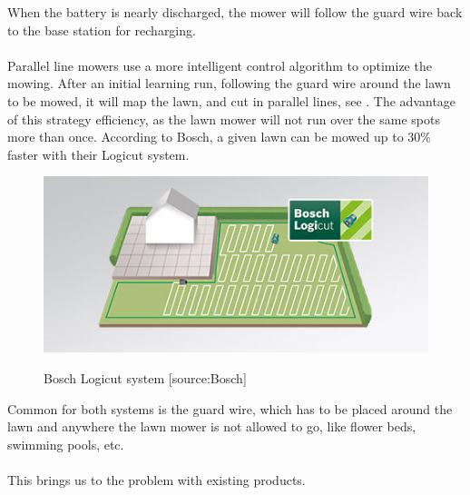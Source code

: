 \noindent
When the battery is nearly discharged, the mower will follow the guard wire back to the base station for recharging.\\\\
\noindent
Parallel line mowers use a more intelligent control algorithm to optimize the mowing. After an initial learning run, following the guard wire around the lawn to be mowed, it will map the lawn, and cut in parallel lines, see . The advantage of this strategy efficiency, as the lawn mower will not run over the same spots more than once. According to Bosch, a given lawn can be mowed up to 30\% faster with their Logicut system.
 

\begin{figure}[H]
\centering
\includegraphics[scale=0.8]{figures/logicut.jpg} 
\label{fig:logicut}
\caption{Bosch Logicut system [source:Bosch]} 
\end{figure}

\noindent
Common for both systems is the guard wire, which has to be placed around the lawn and anywhere the lawn mower is not allowed to go, like flower beds, swimming pools, etc. \\\\
\noindent
This brings us to the problem with existing products.

\nopagebreak


